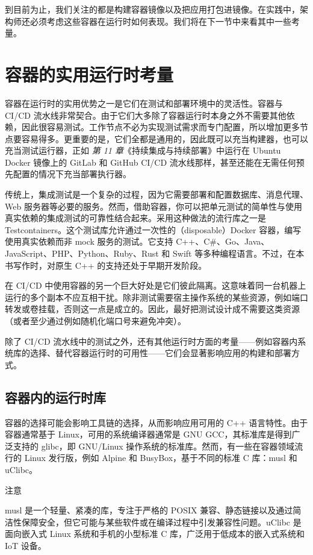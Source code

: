 到目前为止，我们关注的都是构建容器镜像以及把应用打包进镜像。在实践中，架构师还必须考虑这些容器在运行时如何表现。我们将在下一节中来看其中一些考量。

\section{容器的实用运行时考量}

\label{idx:1790}
容器在运行时的实用优势之一是它们在测试和部署环境中的灵活性。容器与 CI/CD 流水线非常契合。由于它们大多除了容器运行时本身之外不需要其他依赖，因此很容易测试。工作节点不必为实现测试需求而专门配置，所以增加更多节点要容易得多。更重要的是，它们全都是通用的，因此既可以充当构建器，也可以充当测试运行器，正如 \emph{第 11 章}《持续集成与持续部署》中运行在 Ubuntu Docker 镜像上的 GitLab 和 GitHub CI/CD 流水线那样，甚至还能在无需任何预先配置的情况下充当部署执行器。

传统上，集成测试是一个复杂的过程，因为它需要部署和配置数据库、消息代理、Web 服务器等必要的服务。然而，借助容器，你可以把单元测试的简单性与使用真实依赖的集成测试的可靠性结合起来。采用这种做法的流行库之一是 Testcontainers。这个测试库允许通过一次性的（disposable）Docker 容器，编写使用真实依赖而非 mock 服务的测试。它支持 C++、C\#、Go、Java、JavaScript、PHP、Python、Ruby、Rust 和 Swift 等多种编程语言。不过，在本书写作时，对原生 C++ 的支持还处于早期开发阶段。

\label{idx:1791}
在 CI/CD 中使用容器的另一个巨大好处是它们彼此隔离。这意味着同一台机器上运行的多个副本不应互相干扰。除非测试需要宿主操作系统的某些资源，例如端口转发或卷挂载，否则这一点是成立的。因此，最好把测试设计成不需要这类资源（或者至少通过例如随机化端口号来避免冲突）。

除了 CI/CD 流水线中的测试之外，还有其他运行时方面的考量——例如容器内系统库的选择、替代容器运行时的可用性——它们会显著影响应用的构建和部署方式。

\subsection{容器内的运行时库}

\label{idx:1792}
容器的选择可能会影响工具链的选择，从而影响应用可用的 C++ 语言特性。由于容器通常基于 Linux，可用的系统编译器通常是 GNU GCC，其标准库是得到广泛支持的 glibc，即 GNU/Linux 操作系统的标准库。然而，有一些在容器领域流行的 Linux 发行版，例如 Alpine 和 BusyBox，基于不同的标准 C 库：musl 和 uClibc。

\begin{myNotic}{注意}

musl 是一个轻量、紧凑的库，专注于严格的 POSIX 兼容、静态链接以及通过简洁性保障安全，但它可能与某些软件或在编译过程中引发兼容性问题。uClibc 是面向嵌入式 Linux 系统和手机的小型标准 C 库，广泛用于低成本的嵌入式系统和 IoT 设备。
\end{myNotic}

